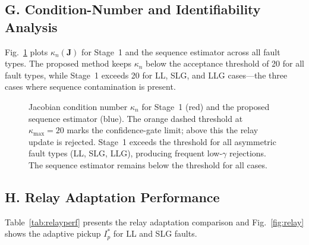 \documentclass[10pt,journal,twoside]{IEEEtran}
\begin{document}
\subsection{G. Condition-Number and Identifiability Analysis}
\label{sec:results:kappa}

Fig.~\ref{fig:conditioning} plots $\kappa_n(\mathbf{J})$ for Stage~1 and
the sequence estimator across all fault types.  The proposed method keeps
$\kappa_n$ below the acceptance threshold of 20 for all fault types, while
Stage~1 exceeds 20 for LL, SLG, and LLG cases---the three cases where
sequence contamination is present.

\begin{figure}[!t]
\centering

\caption{Jacobian condition number $\kappa_n$ for Stage~1 (red) and
  the proposed sequence estimator (blue).  The orange dashed threshold
  at $\kappa_{\max} = 20$ marks the confidence-gate limit; above this
  the relay update is rejected.  Stage~1 exceeds the threshold for all
  asymmetric fault types (LL, SLG, LLG), producing frequent
  low-$\gamma$ rejections.  The sequence estimator remains below the
  threshold for all cases.}
\label{fig:conditioning}
\end{figure}

\subsection{H. Relay Adaptation Performance}
\label{sec:results:relay}

Table~\ref{tab:relayperf} presents the relay adaptation comparison and
Fig.~\ref{fig:relay} shows the adaptive pickup $I_p^*$ for LL and SLG
faults.
\end{document}
